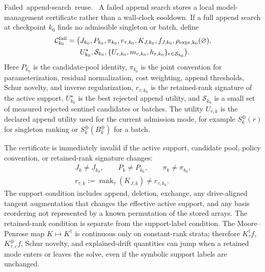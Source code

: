 \documentclass[
  reprint,
  amsmath,
  amssymb,
  aps,
  pra,
  nofootinbib,
  superscriptaddress,
  floatfix
]{revtex4-2}
\newcommand{\tentative}[1]{\textcolor{red!70!black}{#1}}
\newcommand{\structlabel}[1]{\noindent\mbox{\tentative{#1.}}~}
\newcommand{\eps}{\varepsilon}
\begin{document}
\structlabel{Failed append-search reuse}
A failed append search stores a local model-management certificate rather than a wall-clock cooldown.  If a full append search at checkpoint $k_0$ finds no admissible singleton or batch, define
\begin{equation}
\begin{aligned}
\mathcal C_{k_0}^{\rm fail}
=\big(&J_{k_0},P_{k_0},\pi_{k_0},r_{\tau,k_0},
K_{J,k_0},f_{J,k_0},\rho_{\rm expr,k_0}(\varnothing),\\
&U^\star_{k_0},\mathcal S_{k_0},
\{U_{r,k_0},m_{r,k_0},h_{r,k_0}\}_{r\in\mathcal S_{k_0}}\big).
\end{aligned}
\label{eq:failed_append_certificate}
\end{equation}
Here $P_{k_0}$ is the candidate-pool identity, $\pi_{k_0}$ is the joint convention for parameterization, residual normalization, cost weighting, append thresholds, Schur novelty, and inverse regularization, $r_{\tau,k_0}$ is the retained-rank signature of the active support, $U^\star_{k_0}$ is the best rejected append utility, and $\mathcal S_{k_0}$ is a small set of measured rejected sentinel candidates or batches.  The utility $U_{r,k}$ is the declared append utility used for the current admission mode, for example \(S_k^{\oplus}(r)\) for singleton ranking or \(S_k^{\oplus}(B_k^{\oplus})\) for a batch.

The certificate is immediately invalid if the active support, candidate pool, policy convention, or retained-rank signature changes:
\begin{equation}
\begin{gathered}
J_k\ne J_{k_0},\qquad
P_k\ne P_{k_0},\qquad
\pi_k\ne\pi_{k_0},\\
r_{\tau,k}:=\operatorname{rank}_{\tau}(K_{J,k})
\ne
r_{\tau,k_0}.
\end{gathered}
\label{eq:failed_append_invalidation}
\end{equation}
The support condition includes append, deletion, exchange, any drive-aligned tangent augmentation that changes the effective active support, and any basis reordering not represented by a known permutation of the stored arrays.  The retained-rank condition is separate from the support-label condition.  The Moore--Penrose map $K\mapsto K^\dagger$ is continuous only on constant-rank strata; therefore $K_\tau^\dagger f$, $K_{\tau,\eps}^{\oplus}f$, Schur novelty, and explained-drift quantities can jump when a retained mode enters or leaves the solve, even if the symbolic support labels are unchanged.
\end{document}
